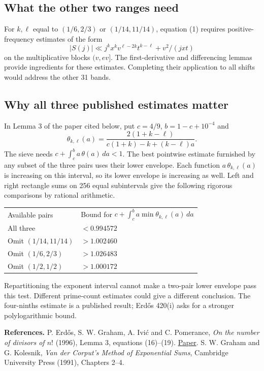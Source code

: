 \documentclass[10pt]{article}
\begin{document}
\subsection*{What the other two ranges need}
For $k,\ell$ equal to $(1/6,2/3)$ or $(1/14,11/14)$, equation (1) requires positive-frequency estimates of the form
\[
 |S(j)|\ll j^k x^k v^{\ell-2k} t^{k-\ell}+v^2/(jxt)
\]
on the multiplicative blocks $(v,ev]$. The first-derivative and differencing lemmas provide ingredients for these estimates. Completing their application to all shifts would address the other 31 bands.
\subsection*{Why all three published estimates matter}
In Lemma 3 of the paper cited below, put $c=4/9$, $b=1-c+10^{-4}$ and
\[
 \theta_{k,\ell}(a)=
 \frac{2(1+k-\ell)}{c(1+k)-k+(k-\ell)a}.
\]
The sieve needs $c+\int_c^b a\,\theta(a)\,da<1$. The best pointwise estimate furnished by any subset of the three pairs uses their lower envelope. Each function $a\,\theta_{k,\ell}(a)$ is increasing on this interval, so its lower envelope is increasing as well. Left and right rectangle sums on 256 equal subintervals give the following rigorous comparisons by rational arithmetic.
\begin{center}
\begin{tabular}{ll}
Available pairs & Bound for $c+\int_c^b a\min\theta_{k,\ell}(a)\,da$\\[3pt]
All three & $<0.994572$\\
Omit $(1/14,11/14)$ & $>1.002460$\\
Omit $(1/6,2/3)$ & $>1.026483$\\
Omit $(1/2,1/2)$ & $>1.000172$\\
\end{tabular}
\end{center}
Repartitioning the exponent interval cannot make a two-pair lower envelope pass this test. Different prime-count estimates could give a different conclusion. The four-ninths estimate is a published result; Erd\H{o}s 420(i) asks for a stronger polylogarithmic bound.

{\small\textbf{References.} P. Erd\H{o}s, S. W. Graham, A. Ivi\'c and C. Pomerance, \emph{On the number of divisors of $n!$} (1996), Lemma 3, equations (16)--(19). \href{https://math.dartmouth.edu/~carlp/factorial.pdf}{Paper}. S. W. Graham and G. Kolesnik, \emph{Van der Corput's Method of Exponential Sums}, Cambridge University Press (1991), Chapters 2--4.}
\end{document}
